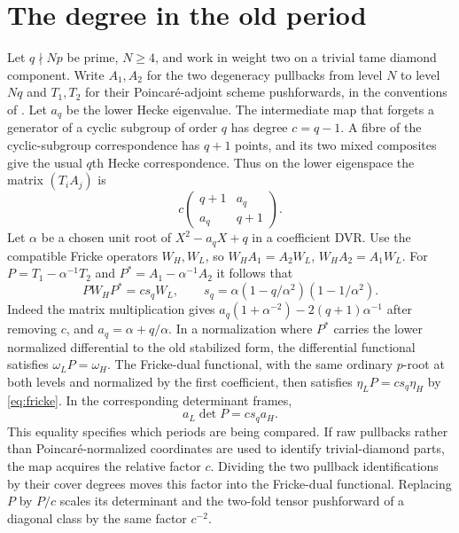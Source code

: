 \documentclass[11pt]{article}
\begin{document}
\section{The degree in the old period}
Let $q\nmid Np$ be prime, $N\ge4$, and work in weight two on a
trivial tame diamond component. Write $A_1,A_2$ for the two degeneracy
pullbacks from level $N$ to level $Nq$ and $T_1,T_2$ for their
Poincar\'e-adjoint scheme pushforwards, in the conventions of
\cite[\S\S2.3--2.4, 5.7]{KLZ}. Let $a_q$ be the lower Hecke eigenvalue.
The intermediate map that forgets a generator of a cyclic subgroup
of order $q$ has degree $c=q-1$. A fibre of the cyclic-subgroup
correspondence has $q+1$ points, and its two mixed composites give the
usual $q$th Hecke correspondence. Thus on the lower eigenspace the
matrix $(T_i A_j)$ is
\[
 c\begin{pmatrix}q+1&a_q\\a_q&q+1\end{pmatrix}.
\]
Let $\alpha$ be a chosen unit root of $X^2-a_qX+q$ in a
coefficient DVR. Use the compatible Fricke operators $W_H,W_L$,
so $W_H A_1=A_2W_L$, $W_H A_2=A_1W_L$. For
$P=T_1-\alpha^{-1}T_2$ and $P^*=A_1-\alpha^{-1}A_2$ it follows that
\begin{equation}\label{eq:fricke}
 P W_H P^*=c s_q W_L,\qquad
 s_q=\alpha(1-q/\alpha^2)(1-1/\alpha^2).
\end{equation}
Indeed the matrix multiplication gives
$a_q(1+\alpha^{-2})-2(q+1)\alpha^{-1}$
after removing $c$, and $a_q=\alpha+q/\alpha$.
In a normalization where $P^*$ carries the lower normalized
differential to the old stabilized form, the differential functional
satisfies $\omega_L P=\omega_H$. The Fricke-dual functional, with
the same ordinary $p$-root at both levels and normalized by the first
coefficient, then satisfies $\eta_LP=c s_q\eta_H$ by
\eqref{eq:fricke}. In the corresponding determinant frames,
\[
 a_L\det P=c s_q a_H.
\]
This equality specifies which periods are being compared. If raw
pullbacks rather than Poincar\'e-normalized coordinates are used to
identify trivial-diamond parts, the map acquires the relative factor
$c$. Dividing the two pullback identifications by their cover
degrees moves this factor into the Fricke-dual functional. Replacing
$P$ by $P/c$ scales its determinant and the two-fold tensor
pushforward of a diagonal class by the same factor $c^{-2}$.
\end{document}
